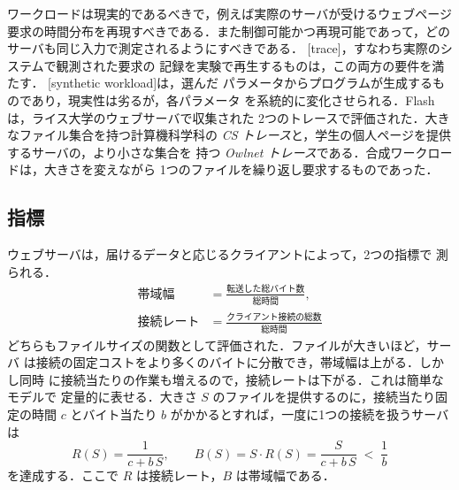 \documentclass[../main.tex]{subfiles}
\begin{document}
ワークロードは現実的であるべきで，例えば実際のサーバが受けるウェブページ
要求の時間分布を再現すべきである．また制御可能かつ再現可能であって，どの
サーバも同じ入力で測定されるようにすべきである．
[trace]，すなわち実際のシステムで観測された要求の
記録を実験で再生するものは，この両方の要件を満たす．
[synthetic workload]は，選んだ
パラメータからプログラムが生成するものであり，現実性は劣るが，各パラメータ
を系統的に変化させられる．Flash は，ライス大学のウェブサーバで収集された
2つのトレースで評価された．大きなファイル集合を持つ計算機科学科の
\emph{CS トレース}と，学生の個人ページを提供するサーバの，より小さな集合を
持つ \emph{Owlnet トレース}である．合成ワークロードは，大きさを変えながら
1つのファイルを繰り返し要求するものであった．

\subsection{指標}

ウェブサーバは，届けるデータと応じるクライアントによって，2つの指標で
測られる．
\begin{equation}
  \begin{aligned}
    \text{帯域幅} &= \frac{\text{転送した総バイト数}}{\text{総時間}} ,\\[1mm]
    \text{接続レート} &= \frac{\text{クライアント接続の総数}}{\text{総時間}}
  \end{aligned}
  \label{eq:l06-bandwidth}
\end{equation}
どちらもファイルサイズの関数として評価された．ファイルが大きいほど，サーバ
は接続の固定コストをより多くのバイトに分散でき，帯域幅は上がる．しかし同時
に接続当たりの作業も増えるので，接続レートは下がる．これは簡単なモデルで
定量的に表せる．大きさ $S$ のファイルを提供するのに，接続当たり固定の時間
$c$ とバイト当たり $b$ がかかるとすれば，一度に1つの接続を扱うサーバは
\begin{equation}
  R(S) = \frac{1}{c + b\,S} ,
  \qquad
  B(S) = S \cdot R(S) = \frac{S}{c + b\,S} \;<\; \frac{1}{b}
  \label{eq:l06-amortize}
\end{equation}
を達成する．ここで $R$ は接続レート，$B$ は帯域幅である．%
\end{document}
